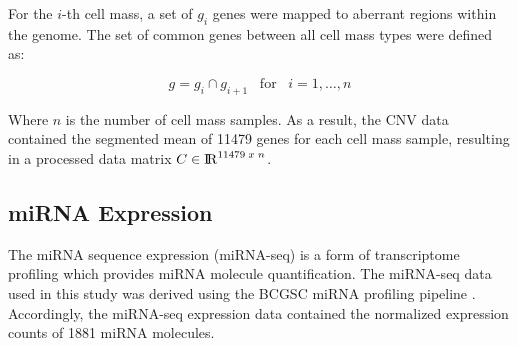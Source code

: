 \begin{table}[ht]
\caption{Significant CNV Abberations Mapped to Gene Ensembl ID in KIRC} %
\centering %
\label{table:mapgene}
\end{table}


\noindent
For the $i$-th cell mass, a set of $g_i$ genes were mapped to aberrant regions within the genome. The set of common genes between all cell mass types were defined as:

\begin{equation}
    g = g_i \cap g_{i+1} \;\;\; \mbox{for} \;\;\; i = 1,\ldots,n
\end{equation}

\noindent
Where $n$ is the number of cell mass samples. As a result, the CNV data contained the segmented mean of 11479 genes for each cell mass sample, resulting in a processed data matrix $C \in {\rm I\!R}^{11479 \; x \; n}$.

\subsection{miRNA Expression}

The miRNA sequence expression (miRNA-seq) is a form of transcriptome profiling which provides miRNA molecule quantification. The miRNA-seq data used in this study was derived using the BCGSC miRNA profiling pipeline \cite{chu2015large}. Accordingly, the miRNA-seq expression data contained the normalized expression counts of 1881 miRNA molecules.

